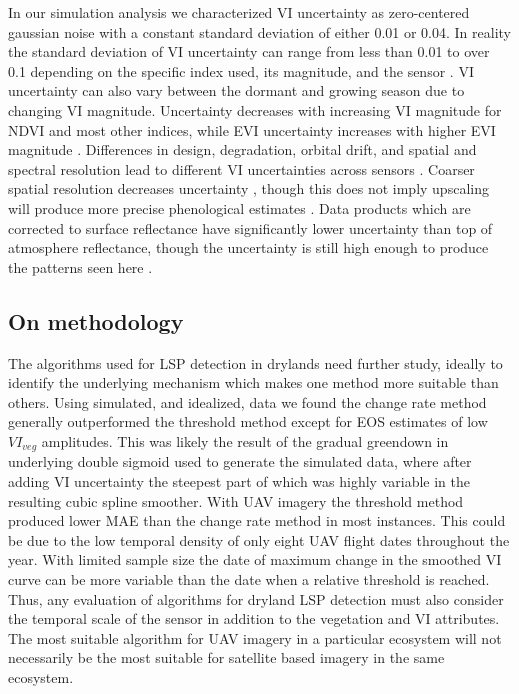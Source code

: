 \documentclass{article}
\begin{document}
In our simulation analysis we characterized VI uncertainty as zero-centered gaussian noise with a constant standard deviation of either 0.01 or 0.04. In reality the standard deviation of VI uncertainty can range from less than 0.01 to over 0.1 depending on the specific index used, its magnitude, and the sensor \cite{miura2000, nagol2009, borgogno-mondino2016}. VI uncertainty can also vary between the dormant and growing season due to changing VI magnitude. Uncertainty decreases with increasing VI magnitude for NDVI and most other indices, while EVI uncertainty increases with higher EVI magnitude \cite{miura2000}. Differences in design, degradation, orbital drift, and spatial and spectral resolution lead to different VI uncertainties across sensors \cite{miura2000, fan2017}. Coarser spatial resolution decreases uncertainty \cite{chen-zorn2013}, though this does not imply upscaling will produce more precise phenological estimates \cite{zhang-wang2017, peng-zhang2017, zeng-wardlow2020}. Data products which are corrected to surface reflectance have significantly lower uncertainty than top of atmosphere reflectance, though the uncertainty is still high enough to produce the patterns seen here \cite{nagol2009}. 

\subsection{On methodology}

The algorithms used for LSP detection in drylands need further study, ideally to identify the underlying mechanism which makes one method more suitable than others. Using simulated, and idealized, data we found the change rate method generally outperformed the threshold method except for EOS estimates of low $VI_{veg}$ amplitudes. This was likely the result of the gradual greendown in underlying double sigmoid used to generate the simulated data, where after adding VI uncertainty the steepest part of which was highly variable in the resulting cubic spline smoother. With UAV imagery the threshold method produced lower MAE than the change rate method in most instances. This could be due to the low temporal density of only eight UAV flight dates throughout the year. With limited sample size the date of maximum change in the smoothed VI curve can be more variable than the date when a relative threshold is reached. Thus, any evaluation of algorithms for dryland LSP detection must also consider the temporal scale of the sensor in addition to the vegetation and VI attributes. The most suitable algorithm for UAV imagery in a particular ecosystem will not necessarily be the most suitable for satellite based imagery in the same ecosystem.
\end{document}
